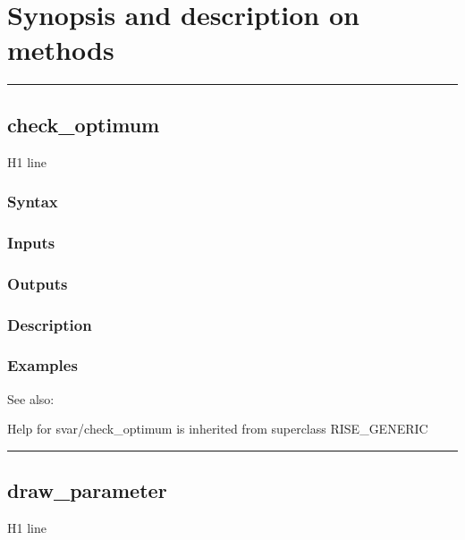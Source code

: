 \documentclass[letterpaper,10pt,english]{sphinxmanual}
\begin{document}
\section{Synopsis and description on methods}
\label{classes/models/@svar/svar:synopsis-and-description-on-methods}

\bigskip\hrule{}\bigskip



\subsection{check\_optimum}
\label{classes/models/@svar/svar:check-optimum}\label{classes/models/@svar/svar:id1}
H1 line


\subsubsection{Syntax}
\label{classes/models/@svar/svar:syntax}

\subsubsection{Inputs}
\label{classes/models/@svar/svar:inputs}

\subsubsection{Outputs}
\label{classes/models/@svar/svar:outputs}

\subsubsection{Description}
\label{classes/models/@svar/svar:description}

\subsubsection{Examples}
\label{classes/models/@svar/svar:examples}
See also:

Help for svar/check\_optimum is inherited from superclass RISE\_GENERIC


\bigskip\hrule{}\bigskip



\subsection{draw\_parameter}
\label{classes/models/@svar/svar:id2}\label{classes/models/@svar/svar:draw-parameter}
H1 line
\end{document}
